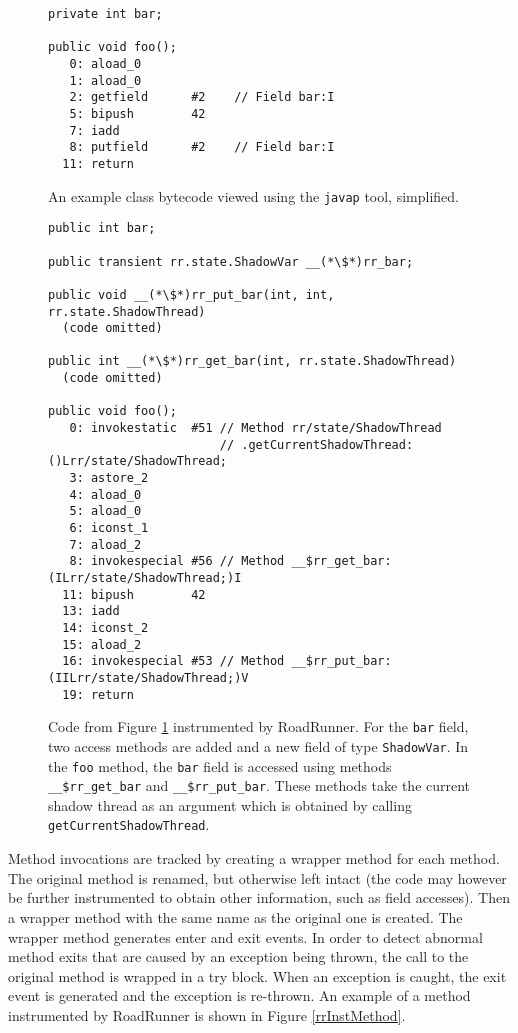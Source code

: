 \begin{figure}[hbt]
    \label{rrInstBefore}
    \begin{lstlisting}
private int bar;

public void foo();
   0: aload_0
   1: aload_0
   2: getfield      #2    // Field bar:I
   5: bipush        42
   7: iadd
   8: putfield      #2    // Field bar:I
  11: return\end{lstlisting}
    \caption{An example class bytecode viewed using the \texttt{javap} tool,
    simplified.}
\end{figure}

\begin{figure}[hbt]
    \label{rrInstField}
    \begin{lstlisting}
public int bar;

public transient rr.state.ShadowVar __(*\$*)rr_bar;

public void __(*\$*)rr_put_bar(int, int, rr.state.ShadowThread)
  (code omitted)

public int __(*\$*)rr_get_bar(int, rr.state.ShadowThread)
  (code omitted)

public void foo();
   0: invokestatic  #51 // Method rr/state/ShadowThread
                        // .getCurrentShadowThread:()Lrr/state/ShadowThread;
   3: astore_2
   4: aload_0
   5: aload_0
   6: iconst_1
   7: aload_2
   8: invokespecial #56 // Method __$rr_get_bar:(ILrr/state/ShadowThread;)I
  11: bipush        42
  13: iadd
  14: iconst_2
  15: aload_2
  16: invokespecial #53 // Method __$rr_put_bar:(IILrr/state/ShadowThread;)V
  19: return\end{lstlisting}
    \caption{Code from Figure \ref{rrInstBefore} instrumented by RoadRunner. For
    the \texttt{bar} field, two access methods are added and a new field of type
    \texttt{ShadowVar}. In the \texttt{foo} method, the \texttt{bar} field is
    accessed using methods \texttt{\_\_\$rr\_get\_bar} and
    \texttt{\_\_\$rr\_put\_bar}. These methods take the current shadow thread as
    an argument which is obtained by calling \texttt{getCurrentShadowThread}.}
\end{figure}

Method invocations are tracked by creating a wrapper method for each method. The
original method is renamed, but otherwise left intact (the code may however be
further instrumented to obtain other information, such as field accesses). Then
a wrapper method with the same name as the original one is created. The wrapper
method generates enter and exit events. In order to detect abnormal method exits
that are caused by an exception being thrown, the call to the original method is
wrapped in a try block. When an exception is caught, the exit event is generated
and the exception is re-thrown. An example of a method instrumented by
RoadRunner is shown in Figure \ref{rrInstMethod}.

